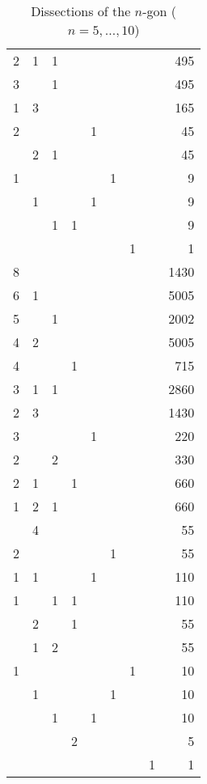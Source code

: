 \documentclass[10pt]{amsart}
\begin{document}
\begin{table}[h]
{\begin{tabular}{|rrrrrrrrr|}
2 & 1 & 1 &&&&&& 495 \\
3 && 1 &&&&&& 495 \\
1 & 3 &&&&&&& 165 \\
2 &&&& 1 &&&& 45 \\
& 2 & 1 &&&&&& 45 \\
1 &&&&& 1 &&& 9 \\
& 1 &&& 1 &&&& 9 \\
&& 1 & 1 &&&&& 9 \\
&&&&&& 1 && 1 \\ \hline
8 &&&&&&&& 1430 \\ 
6 & 1 &&&&&&& 5005 \\
5 && 1 &&&&&& 2002 \\
4 & 2 &&&&&&& 5005 \\
4 &&& 1 &&&&& 715 \\
3 & 1 & 1 &&&&&& 2860 \\
2 & 3 &&&&&&& 1430 \\
3 &&&& 1 &&&& 220 \\
2 && 2 &&&&&& 330 \\
2 & 1 && 1 &&&&& 660 \\
1 & 2 & 1 &&&&&& 660 \\
& 4 &&&&&&& 55 \\ 
2 &&&&& 1 &&& 55 \\
1 & 1 &&& 1 &&&& 110 \\
1 && 1 & 1 &&&&& 110 \\
& 2 && 1 &&&&& 55 \\
& 1 & 2 &&&&&& 55 \\
1 &&&&&& 1 && 10 \\
& 1 &&&& 1 &&& 10 \\
&& 1 && 1 &&&& 10 \\
&&& 2 &&&&& 5 \\ 
&&&&&&& 1 & 1 \\ \hline
\end{tabular}}
\vspace{.2cm}
\caption{Dissections of the $n$-gon ($n=5,\ldots,10$)}
\label{t:diss}
\end{table}

\end{document}
